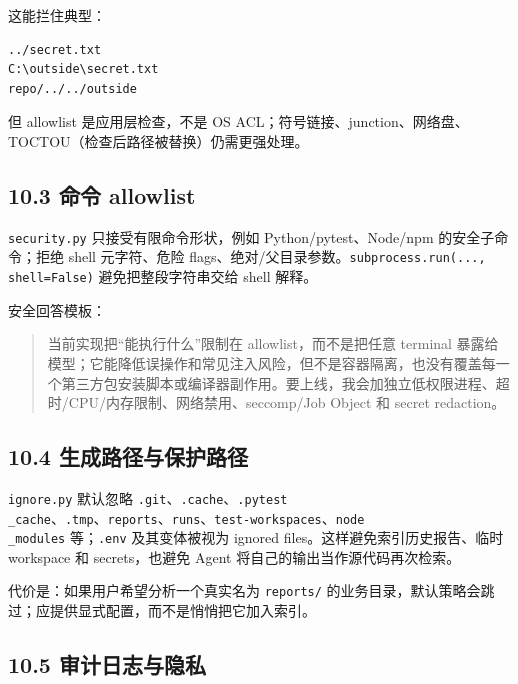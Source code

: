 \documentclass[UTF8,12pt,openany]{ctexbook}
\begin{document}
这能拦住典型：\par

\begin{lstlisting}
../secret.txt
C:\outside\secret.txt
repo/../../outside
\end{lstlisting}

但 allowlist 是应用层检查，不是 OS ACL；符号链接、junction、网络盘、TOCTOU（检查后路径被替换）仍需更强处理。\par

\subsection{10.3 命令 allowlist}

\texttt{security.py} 只接受有限命令形状，例如 Python/pytest、Node/npm 的安全子命令；拒绝 shell 元字符、危险 flags、绝对/父目录参数。\texttt{subprocess.run(..., shell=False)} 避免把整段字符串交给 shell 解释。\par

安全回答模板：\par

\begin{quote}
当前实现把“能执行什么”限制在 allowlist，而不是把任意 terminal 暴露给模型；它能降低误操作和常见注入风险，但不是容器隔离，也没有覆盖每一个第三方包安装脚本或编译器副作用。要上线，我会加独立低权限进程、超时/CPU/内存限制、网络禁用、seccomp/Job Object 和 secret redaction。
\end{quote}

\subsection{10.4 生成路径与保护路径}

\texttt{ignore.py} 默认忽略 \texttt{.git}、\texttt{.cache}、\texttt{.pytest\\_cache}、\texttt{.tmp}、\texttt{reports}、\texttt{runs}、\texttt{test-workspaces}、\texttt{node\\_modules} 等；\texttt{.env} 及其变体被视为 ignored files。这样避免索引历史报告、临时 workspace 和 secrets，也避免 Agent 将自己的输出当作源代码再次检索。\par

代价是：如果用户希望分析一个真实名为 \texttt{reports/} 的业务目录，默认策略会跳过；应提供显式配置，而不是悄悄把它加入索引。\par

\subsection{10.5 审计日志与隐私}
\end{document}
